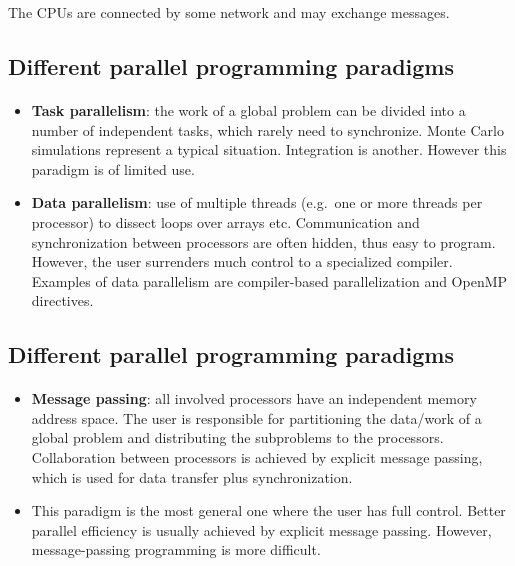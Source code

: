 \documentclass[%
oneside,                 %
final,                   %
10pt]{article}
\begin{document}
\noindent
The CPUs are connected by some network and may exchange messages.



\subsection{Different parallel programming paradigms}

\paragraph{}

\begin{itemize}
\item \textbf{Task parallelism}:  the work of a global problem can be divided into a number of independent tasks, which rarely need to synchronize.  Monte Carlo simulations represent a typical situation. Integration is another. However this paradigm is of limited use.

\item \textbf{Data parallelism}:  use of multiple threads (e.g.~one or more threads per processor) to dissect loops over arrays etc.  Communication and synchronization between processors are often hidden, thus easy to program. However, the user surrenders much control to a specialized compiler. Examples of data parallelism are compiler-based parallelization and OpenMP directives. 
\end{itemize}

\noindent


\subsection{Different parallel programming paradigms}

\paragraph{}

\begin{itemize}
\item \textbf{Message passing}:  all involved processors have an independent memory address space. The user is responsible for  partitioning the data/work of a global problem and distributing the  subproblems to the processors. Collaboration between processors is achieved by explicit message passing, which is used for data transfer plus synchronization.

\item This paradigm is the most general one where the user has full control. Better parallel efficiency is usually achieved by explicit message passing. However, message-passing programming is more difficult.
\end{itemize}
\end{document}

